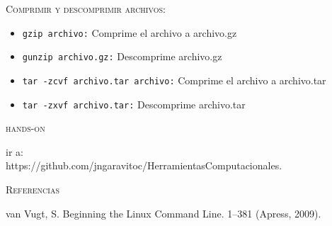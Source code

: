\documentclass{beamer}
\begin{document}

\begin{frame}{\textsc{Comprimir y descomprimir archivos:}}

\begin{itemize}
\item \texttt{gzip archivo:} \textrm{Comprime el archivo a archivo.gz}
\item \texttt{gunzip archivo.gz:} \textrm{Descomprime archivo.gz}
\item \texttt{tar -zcvf archivo.tar archivo:} \textrm{Comprime el archivo a archivo.tar}
\item \texttt{tar -zxvf archivo.tar:} \textrm{Descomprime archivo.tar}
\end{itemize}

\end{frame}




\begin{frame}{\textsc{hands-on}}

\begin{center}
{\Large \textrm{ir a: }}\\

https://github.com/jngaravitoc/HerramientasComputacionales.
\end{center}

\end{frame}



\begin{frame}{\textsc{Referencias}}

 van Vugt, S. Beginning the Linux Command Line. 1–381 (Apress, 2009).
\end{frame}

\end{document}
